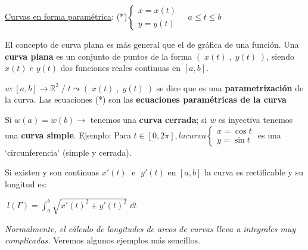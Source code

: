 \underline{Curvas en forma paramétrica}: (*)$\begin{cases}
x=x(t) \\ y=y(t) \end{cases} \quad a\le t \le b$

\vspace{2mm}

\textcolor{gris}{El concepto de curva plana es más general que el de gráfica de una función. Una \textbf{curva plana} es un conjunto de puntos de la forma $(\; x(t)\; ,\; y(t)\; )$, siendo $x(t)\; e $\; $y(t)$ dos funciones reales continuas en $[a,b]$.}

\textcolor{gris}{$w:[a,b] \to \mathbb R^2 \; / \; t  \leadsto (\; x(t)\; ,\; y(t)\; ) $ se dice que es una \textbf{parametrización} de la curva.  Las ecuaciones (*) son las \textbf{ecuaciones paramétricas de la curva}  }

\textcolor{gris}{Si $w(a)=w(b)\to $ tenemos una \textbf{curva cerrada}; si $w$ es inyectiva tenemos una \textbf{curva simple}.  Ejemplo: Para $t\in [0,2\pi], la curva \begin{cases} x=\cos t \\ y = \sin t \end{cases}$ es una `circunferencia' (simple y cerrada).}

\vspace{2mm}

Si existen y son continuas $x'(t)\; $ e $\; y'(t)$ en $[a,b]$ la curva es rectificable y su longitud es:

\hspace{20mm} $\boxed{\;\displaystyle l(\Gamma)=\int_a^b \sqrt{x'(t)^2 + y'(t)^2}\; \dd t\; }$

\vspace{5mm}

\emph{Normalmente, el cálculo de longitudes de arcos de curvas lleva a integrales muy complicadas.} Veremos algunos ejemplos más sencillos.

\vspace{3mm}

